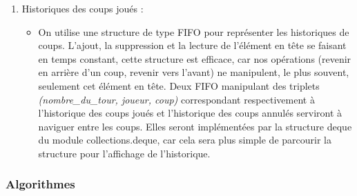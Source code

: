 \documentclass{article}
\begin{document}
\begin{enumerate}
\begin{itemize}
\begin{itemize}
                \item Calcul vectorisé : les opérations se font sur toutes les cases en même temps.
            \end{itemize}
            Pour représenter le plateau, on utilisera deux bitboards : 
            \begin{itemize}
                \item bitboard pour les pièces blanches $bits_w$
                \item bitboard pour les pièces noires $bits_b$
            \end{itemize}
        \end{itemize}
    \item Historiques des coups joués :
        \begin{itemize}
            \item On utilise une structure de type FIFO pour représenter les historiques de coups. L'ajout, la suppression et la lecture de l'élément en tête se faisant en temps constant, cette structure est efficace, car nos opérations (revenir en arrière d'un coup, revenir vers l'avant) ne manipulent, le plus souvent, seulement cet élément en tête. Deux FIFO manipulant des triplets \textit{(nombre\_du\_tour, joueur, coup)} correspondant respectivement à l'historique des coups joués et l'historique des coups annulés serviront à naviguer entre les coups. Elles seront implémentées par la structure deque du module collections.deque, car cela sera plus simple de parcourir la structure pour l'affichage de l'historique. 
        \end{itemize}
\end{enumerate}

\subsubsection{Algorithmes}
\end{document}
